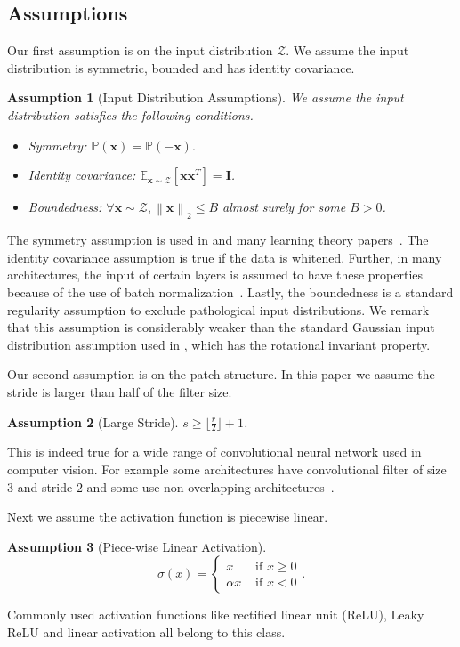 \documentclass[11pt]{article}
\newcommand{\mat}[1]{\mathbf{#1}}
\newcommand{\vect}[1]{\mathbf{#1}}
\newcommand{\norm}[1]{\left\|#1\right\|}
\newcommand{\expect}{\mathbb{E}}
\newcommand{\prob}{\mathbb{P}}
\newcommand{\inputdist}{\mathcal{Z}}
\newtheorem{asmp}{Assumption}[section]
\begin{document}
\subsection{Assumptions}\label{sec:assumptions}
Our first assumption is on the input distribution $\inputdist$.
We assume the input distribution is symmetric, bounded and has identity covariance.
\begin{asmp}[Input Distribution Assumptions]
\label{asmp:input_dist}
We assume the input distribution satisfies the following conditions.
\begin{itemize}
\item Symmetry: $\prob\left(\vect{x}\right) = \prob\left(-\vect{x}\right).$
\item Identity covariance: $\expect_{\vect{x}\sim \inputdist }\left[\vect{x}\vect{x}^T\right] = \mat{I}$.
\item Boundedness: $\forall \vect{x}\sim \inputdist, \norm{\vect{x}}_2 \le B$ almost surely for some $B > 0$.
\end{itemize}
\end{asmp}
The symmetry assumption is used in \cite{goel2018learning} and many learning theory papers~\cite{baum1990polynomial}. The identity covariance assumption is true if the data is whitened. 
Further, in many architectures, the input of certain layers is assumed to have these properties because of the use of batch normalization~\citep{ioffe2015batch}.
Lastly, the boundedness is a standard regularity assumption to exclude pathological input distributions.
We remark that this assumption is considerably weaker than the standard Gaussian input distribution assumption used in \cite{tian2017analytical,zhong2017learning,du2017spurious}, which has the rotational invariant property.



Our second assumption is on the patch structure.
In this paper we assume the stride is larger than half of the filter size.
\begin{asmp}[Large Stride]
\label{asmp:large_stride}
$s \ge \lfloor \frac{r}{2}\rfloor + 1$.
\end{asmp}
This is indeed true for a wide range of convolutional neural network used in computer vision.
For example some architectures have convolutional filter of size $3$ and stride $2$ and some use non-overlapping architectures~\citep{he2016deep}.



Next we assume the activation function is piecewise linear. 
\begin{asmp}[Piece-wise Linear Activation]
  \label{asmp:activation}
  \[\sigma(x) = \begin{cases}
  x &\text{ if } x \ge 0\\
  \alpha x &\text{ if } x < 0
  \end{cases}.
  \]
\end{asmp}
Commonly used activation functions like rectified linear unit (ReLU), Leaky ReLU and linear activation all belong to this class.
\end{document}
